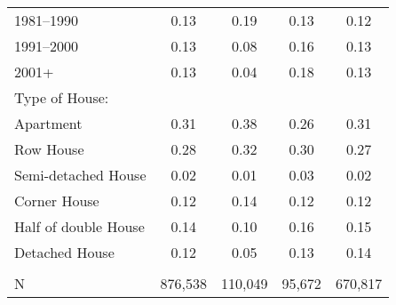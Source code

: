 \documentclass[12pt]{article}
\begin{document}
\begin{table}[H]
\begin{tabular}{lcccc}
1981–1990                        & 0.13           & 0.19             & 0.13        & 0.12      \\
1991–2000                        & 0.13           & 0.08             & 0.16        & 0.13      \\
2001+                            & 0.13           & 0.04             & 0.18        & 0.13      \\
Type of House:                   &                &                  &             &           \\
Apartment                        & 0.31           & 0.38             & 0.26        & 0.31      \\
Row House                        & 0.28           & 0.32             & 0.30        & 0.27      \\
Semi-detached House              & 0.02           & 0.01             & 0.03        & 0.02      \\
Corner House                     & 0.12           & 0.14             & 0.12        & 0.12      \\
Half of double House             & 0.14           & 0.10             & 0.16        & 0.15      \\
Detached House                   & 0.12           & 0.05             & 0.13        & 0.14      \\
&&&&\\
N                                & 876,538      & 110,049        & 95,672    & 670,817 \\
\hline


\end{tabular}
\end{table}
\end{document}
